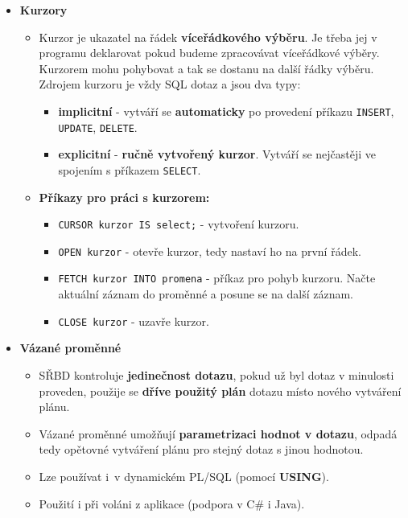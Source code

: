 \begin{itemize}
\item\textbf{Kurzory}
\begin{itemize}
\item Kurzor je ukazatel na řádek \textbf{víceřádkového výběru}. Je třeba jej v programu deklarovat pokud budeme zpracovávat víceřádkové výběry. Kurzorem mohu pohybovat a tak se dostanu na další řádky výběru. Zdrojem kurzoru je vždy SQL dotaz a jsou dva typy:
\begin{itemize}
\item \textbf{implicitní} - vytváří se \textbf{automaticky} po provedení příkazu \texttt{INSERT}, \texttt{UPDATE}, \texttt{DELETE}.
\item \textbf{explicitní} - \textbf{ručně vytvořený kurzor}. Vytváří se nejčastěji ve spojením s příkazem \texttt{SELECT}.
\end{itemize}
\item \textbf{Příkazy pro práci s kurzorem:}
\begin{itemize}
\item \texttt{CURSOR kurzor IS select;} - vytvoření kurzoru.
\item \texttt{OPEN kurzor} - otevře kurzor, tedy nastaví ho na první řádek.
\item \texttt{FETCH kurzor INTO promena} - příkaz pro pohyb kurzoru. Načte aktuální záznam do proměnné a posune se na další záznam.
\item \texttt{CLOSE kurzor} - uzavře kurzor.
\end{itemize}
\end{itemize}


\item\textbf{Vázané proměnné}
\begin{itemize}
\item SŘBD kontroluje \textbf{jedinečnost dotazu}, pokud už byl dotaz v minulosti proveden, použije se \textbf{dříve použitý plán} dotazu místo nového vytváření plánu.
\item Vázané proměnné umožňují \textbf{parametrizaci hodnot v dotazu}, odpadá tedy opětovné vytváření plánu pro stejný dotaz s jinou hodnotou.
\item Lze používat i v dynamickém PL/SQL (pomocí \textbf{USING}).
\item Použití i při voláni z aplikace (podpora v C\# i Java).
\end{itemize}




\end{itemize}
